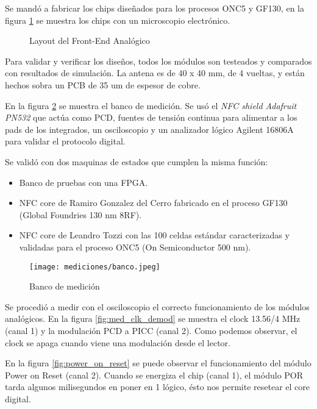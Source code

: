 Se mandó a fabricar los chips diseñados para los procesos ONC5 y GF130, en la figura \ref{fig:chip_completo} se muestra los chips con un microscopio electrónico.

\begin{figure}[H]
\caption{Layout del Front-End Analógico}
\label{fig:chip_completo}
\end{figure}

Para validar y verificar los diseños, todos los módulos son testeados y comparados con resultados de simulación. La antena es de 40 x 40 mm, de 4 vueltas, y están hechos sobra un PCB de 35 um de espesor de cobre. 

En la figura \ref{fig:banco} se muestra el banco de medición. Se usó el \textit{NFC shield Adafruit PN532} que actúa como PCD, fuentes de tensión continua para alimentar a los pads de los integrados, un osciloscopio y un analizador lógico Agilent 16806A para validar el protocolo digital. 

Se validó con dos maquinas de estados que cumplen la misma función: 

\begin{itemize}
	\item Banco de pruebas con una FPGA. 
	\item NFC core de Ramiro Gonzalez del Cerro fabricado en el proceso GF130 (Global Foundries 130 nm 8RF).
	\item NFC core de Leandro Tozzi \cite{lascas_std} con las 100 celdas estándar caracterizadas y validadas para el proceso ONC5 (On Semiconductor 500 nm).
\end{itemize}
 

\begin{figure}[H]
\centering
\texttt{[image: mediciones/banco.jpeg]}
\caption{Banco de medición}
\label{fig:banco}
\end{figure}

Se procedió a medir con el osciloscopio el correcto funcionamiento de los módulos analógicos. En la figura \ref{fig:med_clk_demod} se muestra el clock 13.56/4 MHz (canal 1) y la modulación PCD a PICC (canal 2). Como podemos observar, el clock se apaga cuando viene una modulación desde el lector.

En la figura \ref{fig:power_on_reset} se puede observar el funcionamiento del módulo Power on Reset (canal 2). Cuando se energiza el chip (canal 1), el módulo POR tarda algunos milisegundos en poner en 1 lógico, ésto nos permite resetear el core digital.

